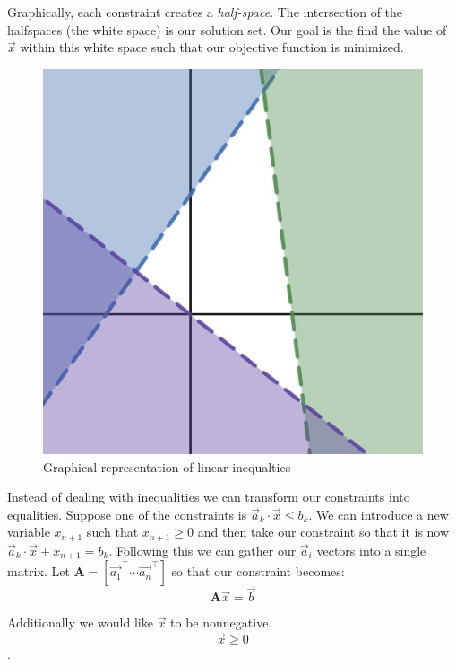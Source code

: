 \documentclass{article}
\begin{document}
\newpage

Graphically, each constraint creates a \emph{half-space}. 
The intersection of the halfspaces (the white space) is our solution set. 
Our goal is the find the value of \( \vec{x} \) within this white space such that our objective function is minimized.\\
\vspace{-1.3em}
\begin{figure}[ht]
  \centering
  \includegraphics[scale=.2]{assets/half_space.jpg}  
  \caption{Graphical representation of linear inequalties}
\end{figure}

Instead of dealing with inequalities we can transform our constraints into equalities.
Suppose one of the constraints is \( \vec{a}_{k} \cdot \vec{x} \leq b_{k} \).
We can introduce a new variable \( x_{n + 1} \) such that \( x_{n + 1} \geq 0 \) and then take our constraint so that it is now \( \vec{a}_k \cdot \vec{x} + x_{n + 1} = b_k \).
Following this we can gather our \( \vec{a}_i \) vectors into a single matrix.
Let $\mathbf{A} = [\vec{a_1}^\top \cdots \vec{a_n}^\top]$ so that our constraint becomes:
\[
\mathbf{A} \vec{x} = \vec{b}
\]

Additionally we would like \( \vec{x} \) to be nonnegative.
\[ \vec{x} \geq 0 \]. 
\end{document}
